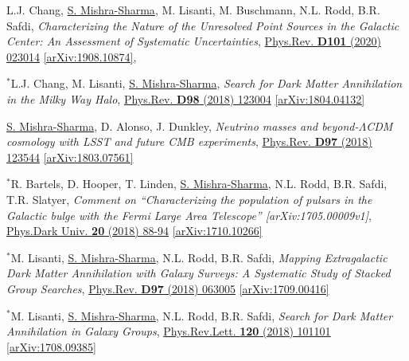 \documentclass[letterpaper,11pt]{article}
\newenvironment{packed_enumerate}[1][]{
\begin{etaremune}[#1]
  \setlength{\itemsep}{3.7pt}
  \setlength{\parskip}{0pt}
  \setlength{\parsep}{0pt}}{\end{etaremune}
}
\begin{document}
\begin{packed_enumerate}[start=43]
  \item L.J. Chang, \underline{S. Mishra-Sharma}, M. Lisanti, M. Buschmann, N.L. Rodd, B.R. Safdi, \emph{Characterizing the Nature of the Unresolved Point Sources in the Galactic Center: An Assessment of Systematic Uncertainties},  \href{https://journals.aps.org/prd/abstract/10.1103/PhysRevD.101.023014}{Phys.Rev. \textbf{D101} (2020) 023014} \href{https://arxiv.org/abs/1908.10874}{[arXiv:1908.10874]}, 

  \item $^*$L.J. Chang, M. Lisanti, \underline{S. Mishra-Sharma}, \emph{Search for Dark Matter Annihilation in the Milky Way Halo}, \href{https://journals.aps.org/prd/abstract/10.1103/PhysRevD.98.123004}{Phys.Rev. \textbf{D98} (2018) 123004} \href{https://arxiv.org/abs/1804.04132}{[arXiv:1804.04132]}

  \item \underline{S. Mishra-Sharma}, D. Alonso, J. Dunkley, \emph{Neutrino masses and beyond-$\Lambda$CDM cosmology with LSST and future CMB experiments}, \href{https://journals.aps.org/prd/abstract/10.1103/PhysRevD.97.123544}{Phys.Rev. \textbf{D97} (2018) 123544}  \href{https://arxiv.org/abs/1803.07561}{[arXiv:1803.07561]}

  \item $^*$R. Bartels, D. Hooper, T. Linden, \underline{S. Mishra-Sharma}, N.L. Rodd, B.R. Safdi, T.R. Slatyer, \emph{Comment on ``Characterizing the population of pulsars in the Galactic bulge with the
  {\it Fermi} Large Area Telescope'' [arXiv:1705.00009\MakeLowercase{v}1]}, \href{https://www.sciencedirect.com/science/article/pii/S2212686418300268}{Phys.Dark Univ. \textbf{20} (2018) 88-94} \href{https://arxiv.org/abs/1710.10266}{[arXiv:1710.10266]}

  \item $^*$M. Lisanti, \underline{S. Mishra-Sharma}, N.L. Rodd, B.R. Safdi, \emph{Mapping Extragalactic Dark Matter Annihilation with Galaxy Surveys: A Systematic Study of Stacked Group Searches},  \href{https://journals.aps.org/prd/abstract/10.1103/PhysRevD.97.063005}{Phys.Rev. \textbf{D97} (2018) 063005} \href{https://arxiv.org/abs/1709.00416}{[arXiv:1709.00416]}

  \item $^*$M. Lisanti, \underline{S. Mishra-Sharma}, N.L. Rodd, B.R. Safdi, \emph{Search for Dark Matter Annihilation in Galaxy Groups},  \href{https://journals.aps.org/prl/abstract/10.1103/PhysRevLett.120.101101}{Phys.Rev.Lett. \textbf{120} (2018) 101101} \href{https://arxiv.org/abs/1708.09385}{[arXiv:1708.09385]}


\end{packed_enumerate}
\end{document}
